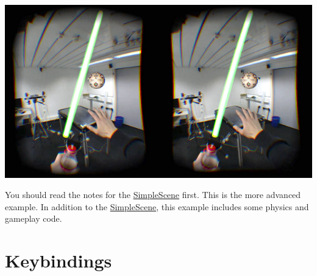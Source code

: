 \includegraphics*[width=\textwidth]{RemoteGameThumb.png}

You should read the notes for the \hyperref[simple_scene]{SimpleScene} first. This is the more advanced example. In addition to the \hyperref[simple_scene]{SimpleScene}, this example includes some physics and gameplay code.

\section{Keybindings}\label{keybindings}

